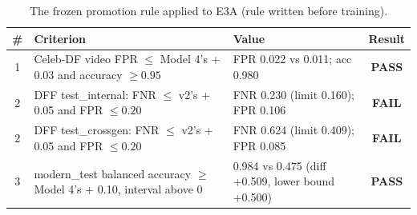 \begin{table}[ht]\centering\caption[Robustness to a class-blind \emph{mixed} degradation (blur, down-up resampling, JPEG, noise]{Robustness to a class-blind \emph{mixed} degradation (blur, down-up resampling, JPEG, noise, low light) applied identically to every crop.}\label{tab:e3-mixed}\small{}\end{table}

\begin{table}[ht]\centering\caption{The frozen promotion rule applied to E3A (rule written before training).}\label{tab:promo-e3a}\small\begin{tabular}{|c|p{5.2cm}|p{4.2cm}|c|}\hline
\textbf{\#} & \textbf{Criterion} & \textbf{Value} & \textbf{Result} \\ \hline
1 & Celeb-DF video FPR $\le$ Model 4's + 0.03 and accuracy $\ge0.95$ & FPR 0.022 vs 0.011; acc 0.980 & \textbf{PASS} \\ \hline
2 & DFF test\_internal: FNR $\le$ v2's + 0.05 and FPR $\le0.20$ & FNR 0.230 (limit 0.160); FPR 0.106 & \textbf{FAIL} \\ \hline
2 & DFF test\_crossgen: FNR $\le$ v2's + 0.05 and FPR $\le0.20$ & FNR 0.624 (limit 0.409); FPR 0.085 & \textbf{FAIL} \\ \hline
3 & modern\_test balanced accuracy $\ge$ Model 4's + 0.10, interval above 0 & 0.984 vs 0.475 (diff +0.509, lower bound +0.500) & \textbf{PASS} \\ \hline
\end{tabular}\end{table}
